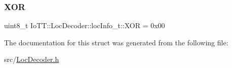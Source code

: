 \mbox{\label{structIoTT_1_1LocDecoder_1_1locInfo__t_a9a3712edbdce8c37415f22683fdd51f3}} 
\subsubsection{\texorpdfstring{X\+OR}{XOR}}
{\footnotesize\ttfamily uint8\+\_\+t Io\+T\+T\+::\+Loc\+Decoder\+::loc\+Info\+\_\+t\+::\+X\+OR = 0x00}



The documentation for this struct was generated from the following file\+:\begin{DoxyCompactItemize}
\item 
src/\hyperlink{LocDecoder_8h}{Loc\+Decoder.\+h}\end{DoxyCompactItemize}
